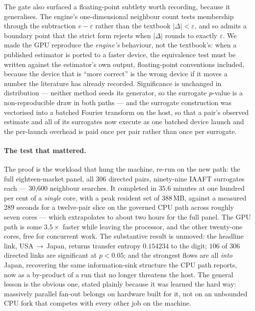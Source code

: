 \documentclass[11pt]{article}
\newcommand{\arrowto}{$\rightarrow$}
\begin{document}
The gate also surfaced a floating-point subtlety worth recording, because it
generalises. The engine's one-dimensional neighbour count tests membership
through the subtraction $v-\varepsilon$ rather than the textbook
$|\Delta|<\varepsilon$, and so admits a boundary point that the strict form
rejects when $|\Delta|$ rounds to exactly $\varepsilon$. We made the GPU
reproduce the \emph{engine's} behaviour, not the textbook's: when a published
estimator is ported to a faster device, the equivalence test must be written
against the estimator's own output, floating-point conventions included, because
the device that is ``more correct'' is the wrong device if it moves a number the
literature has already recorded. Significance is unchanged in distribution ---
neither method seeds its generator, so the surrogate $p$-value is a
non-reproducible draw in both paths --- and the surrogate construction was
vectorised into a batched Fourier transform on the host, so that a pair's
observed estimate and all of its surrogates now execute as one batched device
launch and the per-launch overhead is paid once per pair rather than once per
surrogate.

\paragraph{The test that mattered.} The proof is the workload that hung the
machine, re-run on the new path: the full eighteen-market panel, all 306
directed pairs, ninety-nine IAAFT surrogates each --- 30{,}600 neighbour
searches. It completed in $35.6$ minutes at one hundred per cent of a
\emph{single} core, with a peak resident set of 388\,MB, against a measured 289
seconds for a twelve-pair slice on the governed CPU path across roughly seven
cores --- which extrapolates to about two hours for the full panel. The GPU path
is some $3.5\times$ faster while leaving the processor, and the other twenty-one
cores, free for concurrent work. The substantive result is unmoved: the headline
link, USA\,\arrowto\,Japan, returns transfer entropy $0.154234$ to the digit;
$106$ of $306$ directed links are significant at $p<0.05$; and the strongest
flows are all \emph{into} Japan, recovering the same information-sink structure
the CPU path reports, now as a by-product of a run that no longer threatens the
host. The general lesson is the obvious one, stated plainly because it was
learned the hard way: massively parallel fan-out belongs on hardware built for
it, not on an unbounded CPU fork that competes with every other job on the
machine.
\end{document}
